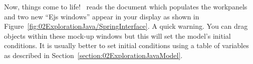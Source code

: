 Now, things come to life! \ejs\ reads the  document which populates the workpanels and two new
``Ejs windows'' appear in your display as shown in Figure~\ref{fig:02ExplorationJava/SpringInterface}. A quick warning. You
can drag objects within these mock-up windows but this will set the model's initial conditions.  It is usually better
to set initial conditions using a table of variables as described in Section~\ref{section:02ExplorationJavaModel}.

\begin{figure}[htb]
  \centering

\end{figure}
